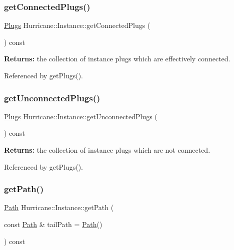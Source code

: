 \mbox{\label{classHurricane_1_1Instance_a18beeab0def83c20e25a710b30dd8ca9}} 
\subsubsection{\texorpdfstring{get\+Connected\+Plugs()}{getConnectedPlugs()}}
{\footnotesize\ttfamily \hyperlink{namespaceHurricane_ac8335d2057483ee7a935c15a9460c64f}{Plugs} Hurricane\+::\+Instance\+::get\+Connected\+Plugs (\begin{DoxyParamCaption}{ }\end{DoxyParamCaption}) const}

{\bfseries Returns\+:} the collection of instance plugs which are effectively connected. 

Referenced by get\+Plugs().

\mbox{\label{classHurricane_1_1Instance_a9622b8b961f459469c275b3dafe1733c}} 
\subsubsection{\texorpdfstring{get\+Unconnected\+Plugs()}{getUnconnectedPlugs()}}
{\footnotesize\ttfamily \hyperlink{namespaceHurricane_ac8335d2057483ee7a935c15a9460c64f}{Plugs} Hurricane\+::\+Instance\+::get\+Unconnected\+Plugs (\begin{DoxyParamCaption}{ }\end{DoxyParamCaption}) const}

{\bfseries Returns\+:} the collection of instance plugs which are not connected. 

Referenced by get\+Plugs().

\mbox{\label{classHurricane_1_1Instance_a4d13f5b9294d0361b724b5824fd86378}} 
\subsubsection{\texorpdfstring{get\+Path()}{getPath()}}
{\footnotesize\ttfamily \hyperlink{classHurricane_1_1Path}{Path} Hurricane\+::\+Instance\+::get\+Path (\begin{DoxyParamCaption}\item[{const \hyperlink{classHurricane_1_1Path}{Path} \&}]{tail\+Path = {\ttfamily \hyperlink{classHurricane_1_1Path}{Path}()} }\end{DoxyParamCaption}) const}

